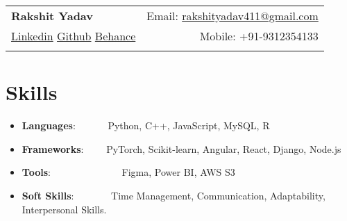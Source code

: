 \documentclass[a4paper,22pt]{article}
\newcommand{\resumeItem}[2]{
  \item\small{
    \textbf{#1}{: #2 \vspace{-2pt}}
  }
}
\newcommand{\resumeSubItem}[2]{\resumeItem{#1}{#2}\vspace{-3pt}}
\newcommand{\resumeSubHeadingListStart}{\begin{itemize}[leftmargin=*]}
\newcommand{\resumeSubHeadingListEnd}{\end{itemize}}
\begin{document}
\begin{tabular*}{\textwidth}{l@{\extracolsep{\fill}}r}
  \textbf{{\LARGE Rakshit Yadav}} & Email: \href{mailto:}{rakshityadav411@gmail.com } 
  \\
  \href{https://www.linkedin.com/in/rakshityadavv/}{Linkedin} \hspace{1pt} \href{https://github.com/RakshitYadav09}{Github} \hspace{1pt} \href{https://www.behance.net/rezzfx}{Behance} &  Mobile: +91-9312354133 \\ \\
\end{tabular*}

\section{Skills}
	\resumeSubHeadingListStart
	\resumeSubItem{Languages}{~~~~~~Python, C++, JavaScript, MySQL, R}
	\resumeSubItem{Frameworks}{~~~~PyTorch, Scikit-learn, Angular, React, Django, Node.js}
	\resumeSubItem{Tools}{~~~~~~~~~~~~~~Figma, Power BI, AWS S3 }
	\resumeSubItem{Soft Skills}{~~~~~~~Time Management, Communication, Adaptability, Interpersonal Skills.}
\resumeSubHeadingListEnd
\vspace{5pt}


\vspace{-5pt}
\end{document}
